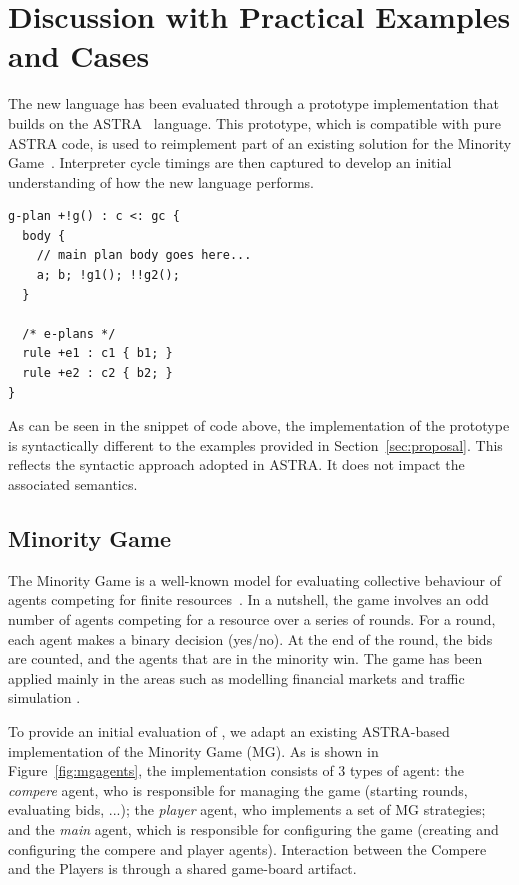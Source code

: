 \section{Discussion with Practical Examples and Cases}
\label{sec:discussion}


The new language has been evaluated through a prototype implementation that builds on 
the ASTRA~\cite{DBLP:conf/prima/CollierRL15} language. This prototype, which is compatible
with pure ASTRA code, is used to reimplement part of an existing solution for the Minority 
Game~\cite{moro2004minority}. Interpreter cycle timings are then captured to develop an initial
understanding of how the new language performs.

{\small
\begin{verbatim}
g-plan +!g() : c <: gc { 
  body {
    // main plan body goes here...
    a; b; !g1(); !!g2();
  }

  /* e-plans */
  rule +e1 : c1 { b1; }
  rule +e2 : c2 { b2; }
}
\end{verbatim}}

As can be seen in the  snippet of code above, the implementation of the {\aser} prototype is 
syntactically different to the examples provided in Section~\ref{sec:proposal}. This reflects 
the syntactic approach adopted in ASTRA. It does not impact the associated semantics.

\subsection{Minority Game}
\label{minority}
The Minority Game is a well-known model for evaluating collective behaviour of agents competing 
for finite resources~\cite{moro2004minority}. In a nutshell, the game involves an odd number of
agents competing for a resource over a series of rounds. For a round, each agent makes a binary
decision (yes/no). At the end of the round, the bids are counted, and the agents that are in the
minority win. The game has been applied mainly in the areas such as modelling financial markets 
\cite{challet2013minority} and traffic simulation \cite{chmura2004minority}.

To provide an initial evaluation of {\aser}, we adapt an existing ASTRA-based implementation of 
the Minority Game (MG). As is shown in Figure~\ref{fig:mgagents}, the implementation consists of
3 types of agent: the \emph{compere} agent, who is responsible for managing the game (starting 
rounds, evaluating bids, ...); the \emph{player} agent, who implements a set of MG strategies; 
and the \emph{main} agent, which is responsible for configuring the game (creating and configuring
the compere and player agents). Interaction between the Compere and the Players is through a shared 
game-board artifact.


